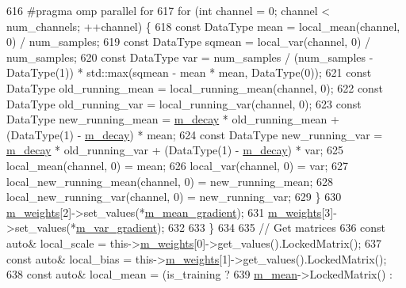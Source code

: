\begin{DoxyCode}
616 \textcolor{preprocessor}{      #pragma omp parallel for}
617       \textcolor{keywordflow}{for} (\textcolor{keywordtype}{int} channel = 0; channel < num\_channels; ++channel) \{
618         \textcolor{keyword}{const} DataType mean = local\_mean(channel, 0) / num\_samples;
619         \textcolor{keyword}{const} DataType sqmean = local\_var(channel, 0) / num\_samples;
620         \textcolor{keyword}{const} DataType var = num\_samples / (num\_samples - DataType(1)) * std::max(sqmean - mean * mean, 
      DataType(0));
621         \textcolor{keyword}{const} DataType old\_running\_mean = local\_running\_mean(channel, 0);
622         \textcolor{keyword}{const} DataType old\_running\_var = local\_running\_var(channel, 0);
623         \textcolor{keyword}{const} DataType new\_running\_mean = \hyperlink{classlbann_1_1batch__normalization_aa2ee72d5efbf47c74796510ee61dbb14}{m\_decay} * old\_running\_mean + (DataType(1) - 
      \hyperlink{classlbann_1_1batch__normalization_aa2ee72d5efbf47c74796510ee61dbb14}{m\_decay}) * mean;
624         \textcolor{keyword}{const} DataType new\_running\_var = \hyperlink{classlbann_1_1batch__normalization_aa2ee72d5efbf47c74796510ee61dbb14}{m\_decay} * old\_running\_var + (DataType(1) - 
      \hyperlink{classlbann_1_1batch__normalization_aa2ee72d5efbf47c74796510ee61dbb14}{m\_decay}) * var;
625         local\_mean(channel, 0) = mean;
626         local\_var(channel, 0) = var;
627         local\_new\_running\_mean(channel, 0) = new\_running\_mean;
628         local\_new\_running\_var(channel, 0) = new\_running\_var;
629       \}
630       \hyperlink{classlbann_1_1Layer_a7954e30fbf9100a6ba4b56d02767a469}{m\_weights}[2]->set\_values(*\hyperlink{classlbann_1_1batch__normalization_aa4677c2f7d5ea27c53bf0f61f280a2a3}{m\_mean\_gradient});
631       \hyperlink{classlbann_1_1Layer_a7954e30fbf9100a6ba4b56d02767a469}{m\_weights}[3]->set\_values(*\hyperlink{classlbann_1_1batch__normalization_aa2d2050a265eed854aa8950cd1461af9}{m\_var\_gradient});
632 
633     \}
634 
635     \textcolor{comment}{// Get matrices}
636     \textcolor{keyword}{const} \textcolor{keyword}{auto}& local\_scale = this->\hyperlink{classlbann_1_1Layer_a7954e30fbf9100a6ba4b56d02767a469}{m\_weights}[0]->get\_values().LockedMatrix();
637     \textcolor{keyword}{const} \textcolor{keyword}{auto}& local\_bias = this->\hyperlink{classlbann_1_1Layer_a7954e30fbf9100a6ba4b56d02767a469}{m\_weights}[1]->get\_values().LockedMatrix();
638     \textcolor{keyword}{const} \textcolor{keyword}{auto}& local\_mean = (is\_training ?
639                               \hyperlink{classlbann_1_1batch__normalization_a7c0db2315a4c5bb662da7a740ae76e24}{m\_mean}->LockedMatrix() :

\end{DoxyCode}
